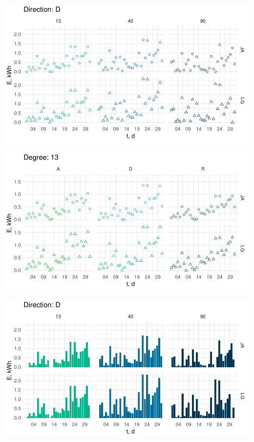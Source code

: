 \begin{center}
    \includegraphics[width=\linewidth]{figures/mar_Deg.pdf}
\end{center}
\begin{center}
    \includegraphics[width=\linewidth]{figures/mar_Dir.pdf}
\end{center}
\begin{center}
    \includegraphics[width=\linewidth]{figures/mar_Degbar.pdf}
\end{center}
